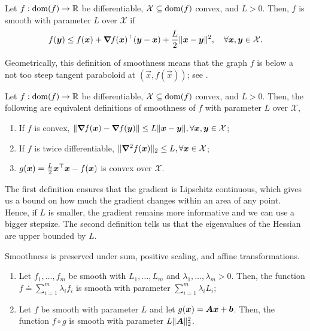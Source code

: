 \begin{definition}[Smoothness] \label{def:smoothness}
    Let $f: \mathrm{dom}(f) \to \mathbb{R}$ be differentiable, $\mathcal{X} \subseteq \mathrm{dom}(f)$ convex, and $L > 0$.
    Then, $f$ is smooth with parameter $L$ over $\mathcal{X}$ if \[
        f(\bm{y}) \leq f(\bm{x}) + \bm{\nabla}_{\! } f(\bm{x})^\top (\bm{y}-\bm{x}) + \frac{L}{2} \|\bm{x}-\bm{y}\|^2, \quad \forall \bm{x}, \bm{y} \in \mathcal{X}.
    \]
\end{definition}

Geometrically, this definition of smoothness means that the graph $f$ is below a not too steep
tangent paraboloid at $(\vec{x},f(\vec{x}))$; see .

\begin{lemma}
    Let $f: \mathrm{dom}(f) \to \mathbb{R}$ be differentiable, $\mathcal{X} \subseteq \mathrm{dom}(f)$ convex, and $L > 0$.
    Then, the following are equivalent definitions of smoothness of $f$ with parameter $L$ over $\mathcal{X}$,
    \begin{enumerate}
        \item If $f$ is convex, $\| \bm{\nabla}_{\! } f(\bm{x}) - \bm{\nabla}_{\! } f(\bm{y}) \| \leq L \| \bm{x} - \bm{y} \|,
                  \forall \bm{x}, \bm{y} \in \mathcal{X}$;
        \item If $f$ is twice differentiable, $\| \bm{\nabla}^2_{\! } f(\bm{x}) \|_2 \leq L, \forall \bm{x} \in
                  \mathcal{X}$;
        \item $g(\bm{x}) = \frac{L}{2} \bm{x}^\top \bm{x} - f(\bm{x})$ is convex over $\mathcal{X}$.
    \end{enumerate}
\end{lemma}

The first definition ensures that the gradient is Lipschitz continuous, which gives us a bound on
how much the gradient changes within an area of any point. Hence, if $L$ is smaller, the gradient
remains more informative and we can use a bigger stepsize. The second definition tells us that the
eigenvalues of the Hessian are upper bounded by $L$.

\begin{lemma}
    Smoothness is preserved under sum, positive scaling, and affine transformations.

    \begin{enumerate}
        \item Let $f_1,\ldots,f_m$ be smooth with $L_1,\ldots,L_m$ and $\lambda_1,\ldots,\lambda_m > 0$. Then,
              the function $f \doteq \sum_{i=1}^{m} \lambda_i f_i$ is smooth with parameter $\sum_{i=1}^{m}
                  \lambda_i L_i$;
        \item Let $f$ be smooth with parameter $L$ and let $g(\bm{x}) = \bm{A}\bm{x} + \bm{b}$. Then, the
              function $f\circ g$ is smooth with parameter $L\|\bm{A}\|_2^2$.
    \end{enumerate}

\end{lemma}

